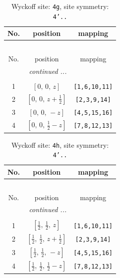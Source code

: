 \documentclass[fleqn,8pt]{jsarticle}
\begin{document}
\renewcommand{\arraystretch}{1.2}
\begin{longtable}{ccc}
\caption{Wyckoff site: {\tt 4g}, site symmetry: {\tt 4'..}}
 \\
 \hline \hline
No. & position & mapping \\ \hline \endfirsthead

\multicolumn{2}{l}{\tablename\ \thetable{}} \\
 \hline \hline
No. & position & mapping \\ \hline \endhead

 \hline \hline
\multicolumn{2}{r}{\footnotesize\it continued ...} \\ \endfoot

 \hline \hline
\multicolumn{2}{r}{} \\ \endlastfoot

1 & $\left[ 0,\, 0,\, z \right]$ & {\tt [1,6,10,11]} \\ \hline
2 & $\left[ 0,\, 0,\, z + \frac{1}{2} \right]$ & {\tt [2,3,9,14]} \\ \hline
3 & $\left[ 0,\, 0,\, - z \right]$ & {\tt [4,5,15,16]} \\ \hline
4 & $\left[ 0,\, 0,\, \frac{1}{2} - z \right]$ & {\tt [7,8,12,13]} \\
\end{longtable}
\renewcommand{\arraystretch}{1.2}
\begin{longtable}{ccc}
\caption{Wyckoff site: {\tt 4h}, site symmetry: {\tt 4'..}}
 \\
 \hline \hline
No. & position & mapping \\ \hline \endfirsthead

\multicolumn{2}{l}{\tablename\ \thetable{}} \\
 \hline \hline
No. & position & mapping \\ \hline \endhead

 \hline \hline
\multicolumn{2}{r}{\footnotesize\it continued ...} \\ \endfoot

 \hline \hline
\multicolumn{2}{r}{} \\ \endlastfoot

1 & $\left[ \frac{1}{2},\, \frac{1}{2},\, z \right]$ & {\tt [1,6,10,11]} \\ \hline
2 & $\left[ \frac{1}{2},\, \frac{1}{2},\, z + \frac{1}{2} \right]$ & {\tt [2,3,9,14]} \\ \hline
3 & $\left[ \frac{1}{2},\, \frac{1}{2},\, - z \right]$ & {\tt [4,5,15,16]} \\ \hline
4 & $\left[ \frac{1}{2},\, \frac{1}{2},\, \frac{1}{2} - z \right]$ & {\tt [7,8,12,13]} \\
\end{longtable}
\end{document}

